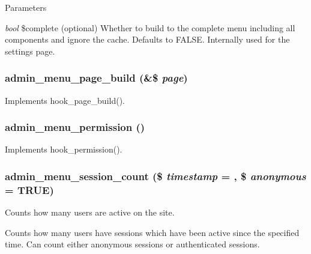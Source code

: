 \begin{DoxyParams}{Parameters}
\item[{\em bool}]\$complete (optional) Whether to build to the complete menu including all components and ignore the cache. Defaults to FALSE. Internally used for the settings page. \end{DoxyParams}
\hypertarget{admin__menu_8module_a8677d20e73452e73b868bf871abf57a1}{
\subsubsection[{admin\_\-menu\_\-page\_\-build}]{\setlength{\rightskip}{0pt plus 5cm}admin\_\-menu\_\-page\_\-build (\&\$ {\em page})}}
\label{admin__menu_8module_a8677d20e73452e73b868bf871abf57a1}
Implements hook\_\-page\_\-build(). \hypertarget{admin__menu_8module_a3426d8ce72ca5c37740a6e7a1aa269c1}{
\subsubsection[{admin\_\-menu\_\-permission}]{\setlength{\rightskip}{0pt plus 5cm}admin\_\-menu\_\-permission ()}}
\label{admin__menu_8module_a3426d8ce72ca5c37740a6e7a1aa269c1}
Implements hook\_\-permission(). \hypertarget{admin__menu_8module_a6fe5151c8d300535152c76edffcf6f5d}{
\subsubsection[{admin\_\-menu\_\-session\_\-count}]{\setlength{\rightskip}{0pt plus 5cm}admin\_\-menu\_\-session\_\-count (\$ {\em timestamp} = {}, \/  \$ {\em anonymous} = {\ttfamily TRUE})}}
\label{admin__menu_8module_a6fe5151c8d300535152c76edffcf6f5d}
Counts how many users are active on the site.

Counts how many users have sessions which have been active since the specified time. Can count either anonymous sessions or authenticated sessions.


